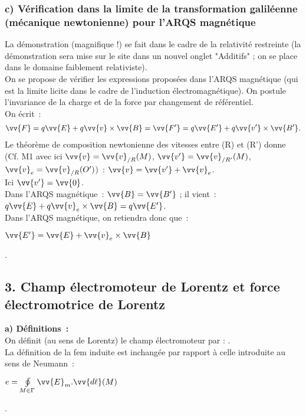 \documentclass{article}
\newcommand{\mathcolorbox}[2]{\colorbox{#1}{$#2$}}
\let\oldoint\oint
\renewcommand{\oint}{\oldoint\limits}
\renewcommand\overrightarrow{\vv}
\begin{document}
\subsubsection*{c) Vérification dans la limite de la transformation
galiléenne (mécanique newtonienne) pour l'ARQS magnétique}
La démonstration (magnifique !) se fait dans le cadre de
la relativité restreinte (la démonstration sera mise sur le site
dans un nouvel onglet
"Additifs" ; on se place dans le domaine faiblement relativiste). \\
On se propose de vérifier les expressions proposées dans l'ARQS
magnétique (qui est la limite licite dans le cadre de l'induction
électromagnétique). On postule l'invariance de la charge et de la
force par
changement de référentiel. \\
On écrit :
\begin{eqnarray}\label{Eq.10}
\overrightarrow{F}=q\overrightarrow{E}+q\overrightarrow{v}\times\overrightarrow{B}
=
\overrightarrow{F'}=q\overrightarrow{E'}+q\overrightarrow{v'}\times\overrightarrow{B'}.
\end{eqnarray}
Le théorème de composition newtonienne des vitesses entre (R) et
(R') donne (Cf. M1 avec ici $\overrightarrow{v} =
\overrightarrow{v}_{/R}(M)$, $\overrightarrow{v'} =
\overrightarrow{v}_{/R'}(M)$, $\overrightarrow{v}_{e} =
\overrightarrow{v}_{/R}(O')$) : $\overrightarrow{v} =
\overrightarrow{v'}+\overrightarrow{v}_{e}$. \\
Ici $\overrightarrow{v'} = \overrightarrow{0}$. \\
Dans l'ARQS magnétique : $\overrightarrow{B} = \overrightarrow{B'}$
; il vient : $q\overrightarrow{E}+q\overrightarrow{v}_{e} \times
\overrightarrow{B} = q\overrightarrow{E'}$. \\
Dans l'ARQS magnétique, on retiendra donc que : \\
\centerline{\mathcolorbox{gray!20}{\overrightarrow{E'}=\overrightarrow{E}+\overrightarrow{v}_{e}
\times \overrightarrow{B}}}.

\subsection*{3. Champ électromoteur de Lorentz et force électromotrice
de Lorentz} \textbf{ a)  Définitions :} \\
On définit (au sens de Lorentz) le champ électromoteur par
: \fbox{$\overrightarrow{E}_{m}=\overrightarrow{v}_{e}\times
\overrightarrow{B}$}.
\\
La définition de la fem induite est inchangée par rapport à celle introduite au sens de Neumann : \\
\centerline{\mathcolorbox{gray!20}{e=\oint_{M\in
\Gamma}\overrightarrow{E}_{m}.\overrightarrow{d\ell}(M)}}.
\end{document}
